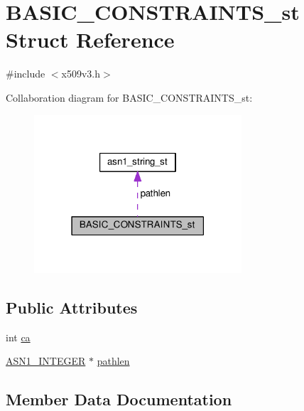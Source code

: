 \hypertarget{struct_b_a_s_i_c___c_o_n_s_t_r_a_i_n_t_s__st}{}\section{B\+A\+S\+I\+C\+\_\+\+C\+O\+N\+S\+T\+R\+A\+I\+N\+T\+S\+\_\+st Struct Reference}
\label{struct_b_a_s_i_c___c_o_n_s_t_r_a_i_n_t_s__st}


{\ttfamily \#include $<$x509v3.\+h$>$}



Collaboration diagram for B\+A\+S\+I\+C\+\_\+\+C\+O\+N\+S\+T\+R\+A\+I\+N\+T\+S\+\_\+st\+:
\nopagebreak
\begin{figure}[H]
\begin{center}
\leavevmode
\includegraphics[width=219pt]{struct_b_a_s_i_c___c_o_n_s_t_r_a_i_n_t_s__st__coll__graph}
\end{center}
\end{figure}
\subsection*{Public Attributes}
\begin{DoxyCompactItemize}
\item 
int \hyperlink{struct_b_a_s_i_c___c_o_n_s_t_r_a_i_n_t_s__st_ab8ac4eeb5ae30bd87b9ffdef9e35c218}{ca}
\item 
\hyperlink{ossl__typ_8h_af4335399bf9774cb410a5e93de65998b}{A\+S\+N1\+\_\+\+I\+N\+T\+E\+G\+ER} $\ast$ \hyperlink{struct_b_a_s_i_c___c_o_n_s_t_r_a_i_n_t_s__st_ab0a6cfe28df8cd5f8bc4f24a3277c7b4}{pathlen}
\end{DoxyCompactItemize}


\subsection{Member Data Documentation}
